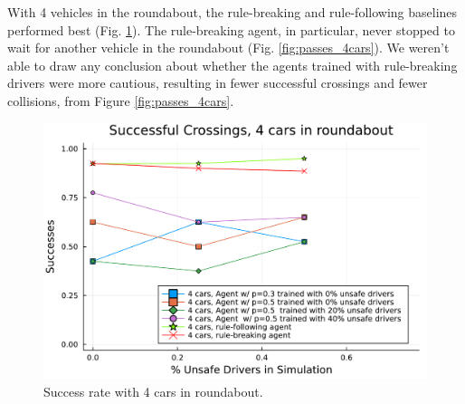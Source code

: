 \documentclass[conference]{IEEEtran}
\begin{document}
\clearpage
With 4 vehicles in the roundabout, the rule-breaking and rule-following baselines performed best (Fig. \ref{fig:success_4cars}). The rule-breaking agent, in particular, never stopped to wait for another vehicle in the roundabout (Fig. \ref{fig:passes_4cars}). We weren't able to draw any conclusion about whether the agents trained with rule-breaking drivers were more cautious, resulting in fewer successful crossings and fewer collisions, from Figure \ref{fig:passes_4cars}.
\begin{figure}[h]
	\centering
	\includegraphics[width=0.9\linewidth]{figures/successes_3.pdf}
	\caption{Success rate with 4 cars in roundabout.}
	\label{fig:success_4cars}
\end{figure}
\end{document}
